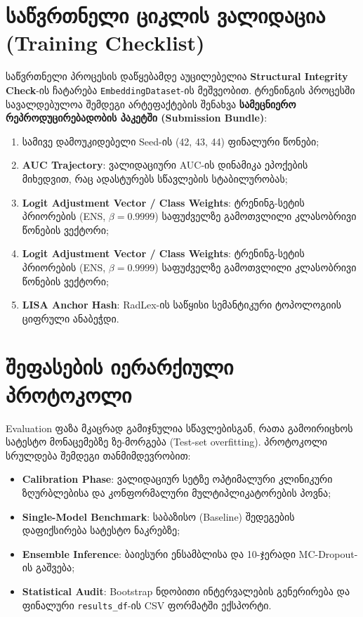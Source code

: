 \documentclass[12pt,a4paper,oneside]{report}
\begin{document}
\section{საწვრთნელი ციკლის ვალიდაცია (Training Checklist)}
საწვრთნელი პროცესის დაწყებამდე აუცილებელია \textbf{Structural Integrity Check}-ის ჩატარება \texttt{EmbeddingDataset}-ის მეშვეობით. ტრენინგის პროცესში სავალდებულოა შემდეგი არტეფაქტების შენახვა \textbf{სამეცნიერო რეპროდუცირებადობის პაკეტში (Submission Bundle)}:
\begin{enumerate}
    \item სამივე დამოუკიდებელი Seed-ის (42, 43, 44) ფინალური წონები;
    \item \textbf{AUC Trajectory}: ვალიდაციური AUC-ის დინამიკა ეპოქების მიხედვით, რაც ადასტურებს სწავლების სტაბილურობას;
    \item \textbf{Logit Adjustment Vector / Class Weights}: ტრენინგ-სეტის პრიორების (ENS, $\beta=0.9999$) საფუძველზე გამოთვლილი კლასობრივი წონების ვექტორი;
    \item \textbf{Logit Adjustment Vector / Class Weights}: ტრენინგ-სეტის პრიორების (ENS, $\beta=0.9999$) საფუძველზე გამოთვლილი კლასობრივი წონების ვექტორი;
    \item \textbf{LISA Anchor Hash}: RadLex-ის საწყისი სემანტიკური ტოპოლოგიის ციფრული ანაბეჭდი.
\end{enumerate}

\section{შეფასების იერარქიული პროტოკოლი}
Evaluation ფაზა მკაცრად გამიჯნულია სწავლებისგან, რათა გამოირიცხოს სატესტო მონაცემებზე ზე-მორგება (Test-set overfitting). პროტოკოლი სრულდება შემდეგი თანმიმდევრობით:
\begin{itemize}
    \item \textbf{Calibration Phase}: ვალიდაციურ სეტზე ოპტიმალური კლინიკური ზღურბლებისა და კონფორმალური მულტიპლიკატორების პოვნა;
    \item \textbf{Single-Model Benchmark}: საბაზისო (Baseline) შედეგების დაფიქსირება სატესტო ნაკრებზე;
    \item \textbf{Ensemble Inference}: ბაიესური ენსამბლისა და 10-ჯერადი MC-Dropout-ის გაშვება;
    \item \textbf{Statistical Audit}: Bootstrap ნდობითი ინტერვალების გენერირება და ფინალური \texttt{results\_df}-ის CSV ფორმატში ექსპორტი.
\end{itemize}
\end{document}
